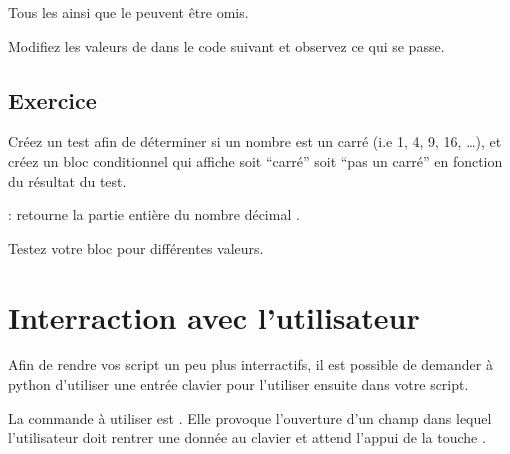 \documentclass[letterpaper,10pt,english]{sphinxmanual}
\begin{document}
Tous les  ainsi que le  peuvent être omis.

Modifiez les valeurs de  dans le code suivant et observez ce qui se passe.

\begin{sphinxVerbatim}[commandchars=\\\{\}]
  

   
   
    
\end{sphinxVerbatim}


\subsection{Exercice}
\label{\detokenize{src/OCI03_Booleans_IfBlock:id1}}
Créez un test afin de déterminer si un nombre est un carré (i.e 1, 4, 9, 16, …), et créez un bloc conditionnel qui affiche soit “carré” soit “pas un carré” en fonction du résultat du test.

 :  retourne la partie entière du nombre décimal .

Testez votre bloc pour différentes valeurs.


\section{Interraction avec l’utilisateur}
\label{\detokenize{src/OCI03_Booleans_IfBlock:interraction-avec-l-utilisateur}}
Afin de rendre vos script un peu plus interractifs, il est possible de demander à python d’utiliser une entrée clavier pour l’utiliser ensuite dans votre script.

La commande à utiliser est . Elle provoque l’ouverture d’un champ dans lequel l’utilisateur doit rentrer une donnée au clavier et attend l’appui de la touche .
\end{document}
